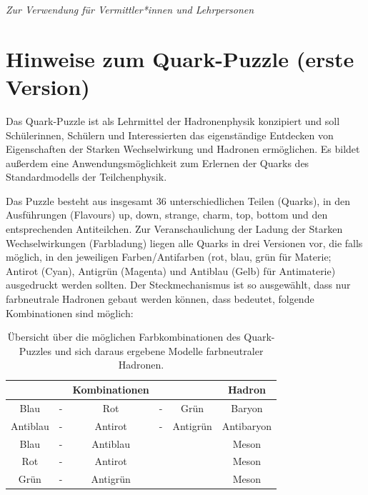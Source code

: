 

\hfill\textit{Zur Verwendung für Vermittler*innen und Lehrpersonen}
\section*{Hinweise zum Quark-Puzzle (erste Version)}

Das Quark-Puzzle ist als Lehrmittel der Hadronenphysik konzipiert und soll Schülerinnen, Schülern und Interessierten das eigenständige Entdecken von Eigenschaften der Starken Wechselwirkung und Hadronen ermöglichen. Es bildet außerdem eine Anwendungsmöglichkeit zum Erlernen der Quarks des Standardmodells der Teilchenphysik. 

Das Puzzle besteht aus insgesamt 36 unterschiedlichen Teilen (Quarks), in den Ausführungen (Flavours) up, down, strange, charm, top, bottom und den entsprechenden Antiteilchen. Zur Veranschaulichung der Ladung der Starken Wechselwirkungen (Farbladung) liegen alle Quarks in drei Versionen vor, die falls möglich, in den jeweiligen Farben/Antifarben (rot, blau, grün für Materie; Antirot (Cyan), Antigrün (Magenta) und Antiblau (Gelb) für Antimaterie) ausgedruckt werden sollten.  
	Der Steckmechanismus ist so ausgewählt, dass nur farbneutrale Hadronen gebaut werden können, dass bedeutet, folgende Kombinationen sind möglich:
\begin{table}[h]
    \centering
       \caption[Übersicht über die möglichen Farbkombinationen des Quark-Puzzles  und sich daraus ergebene Modelle farbneutraler Hadronen.]{Übersicht über die möglichen Farbkombinationen des Quark-Puzzles und sich daraus ergebene Modelle farbneutraler Hadronen.}
    \label{tab:QuarkPuzzle}
    \begin{tabular}{ccccc|c}
         & & Kombinationen &&   & Hadron\\ \hline
        Blau &-& Rot &-& Grün  & Baryon\\
        Antiblau &-& Antirot &-& Antigrün & Antibaryon\\
        Blau &-& Antiblau &&& Meson\\
        Rot &-& Antirot&&& Meson \\
        Grün &-& Antigrün&&& Meson
    \end{tabular}
    \end{table}


